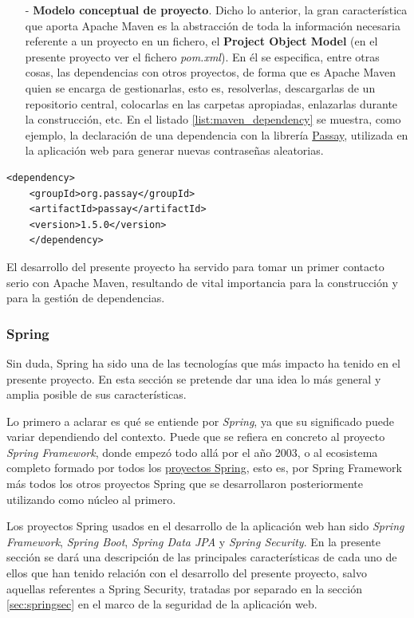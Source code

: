 \documentclass[a4paper]{article}
\begin{document}
\begin{itemize}
    	\item[-] \textbf{Modelo conceptual de proyecto}. Dicho lo anterior, la gran característica que aporta Apache Maven es la abstracción de toda la información necesaria referente a un proyecto en un fichero, el \textbf{Project Object Model} (en el presente proyecto ver el fichero \emph{pom.xml}). En él se especifica, entre otras cosas, las dependencias con otros proyectos, de forma que es Apache Maven quien se encarga de gestionarlas, esto es, resolverlas, descargarlas de un repositorio central, colocarlas en las carpetas apropiadas, enlazarlas durante la construcción, etc. En el listado \ref{list:maven_dependency} se muestra, como ejemplo, la declaración de una dependencia con la librería \href{https://www.passay.org/}{Passay}, utilizada en la aplicación web para generar nuevas contraseñas aleatorias. 
    \end{itemize}
    
    \begin{lstlisting}[caption=Declaración de dependencia en Apache Maven, label=list:maven_dependency]
    <dependency>
    <groupId>org.passay</groupId>
    <artifactId>passay</artifactId>
    <version>1.5.0</version>
    </dependency>
    \end{lstlisting}
    
    El desarrollo del presente proyecto ha servido para tomar un primer contacto serio con Apache Maven, resultando de vital importancia para la construcción y para la gestión de dependencias.
    
    \subsubsection{Spring} \label{sec:spring}
    Sin duda, Spring ha sido una de las tecnologías que más impacto ha tenido en el presente proyecto. En esta sección se pretende dar una idea lo más general y amplia posible de sus características.
    
    Lo primero a aclarar es qué se entiende por \emph{Spring}, ya que su significado puede variar dependiendo del contexto. Puede que se refiera en concreto al proyecto \emph{Spring Framework}, donde empezó todo allá por el año 2003, o al ecosistema completo formado por todos los \href{https://spring.io/projects}{proyectos Spring}, esto es, por Spring Framework más todos los otros proyectos Spring que se desarrollaron posteriormente utilizando como núcleo al primero.
    
    Los proyectos Spring usados en el desarrollo de la aplicación web han sido \emph{Spring Framework}, \emph{Spring Boot}, \emph{Spring Data JPA} y \emph{Spring Security}. En la presente sección se dará una descripción de las principales características de cada uno de ellos que han tenido relación con el desarrollo del presente proyecto, salvo aquellas referentes a Spring Security, tratadas por separado en la sección \ref{sec:springsec} en el marco de la seguridad de la aplicación web.
    
\end{document}

